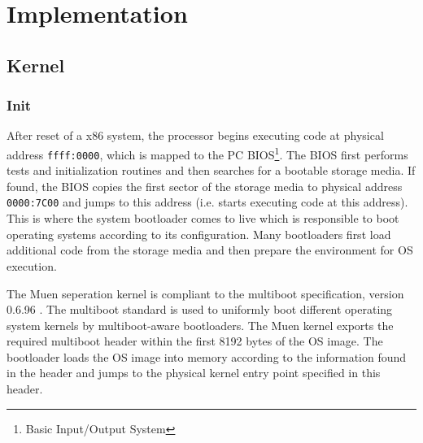 \chapter{Implementation}



\section{Kernel}
\subsection{Init}\label{subsec:init}
After reset of a x86 system, the processor begins executing code at physical
address \texttt{ffff:0000}, which is mapped to the PC
BIOS\footnote{Basic Input/Output System}. The BIOS first performs
tests and initialization routines and then searches for a bootable storage
media. If found, the BIOS copies the first sector of the storage media to
physical address \texttt{0000:7C00} and jumps to this address (i.e. starts
executing code at this address). This is where the system bootloader comes to
live which is responsible to boot operating systems according to its
configuration. Many bootloaders first load additional code from the storage
media and then prepare the environment for OS execution.

The Muen seperation kernel is compliant to the multiboot specification, version
0.6.96 \cite{multiboot}. The multiboot standard is used to uniformly boot
different operating system kernels by multiboot-aware bootloaders.
The Muen kernel exports the required multiboot header within the first 8192
bytes of the OS image. The bootloader loads the OS image into memory according
to the information found in the header and jumps to the physical kernel entry
point specified in this header.

